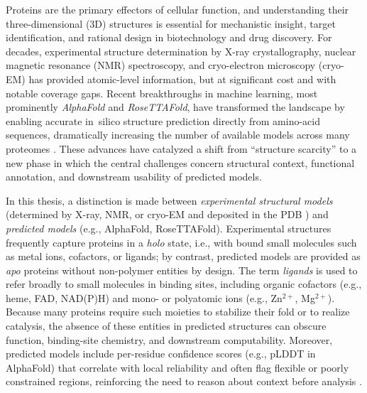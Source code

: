 \label{chap:introduction}

Proteins are the primary effectors of cellular function, and understanding their three-dimensional (3D) structures is essential for mechanistic insight, target identification, and rational design in biotechnology and drug discovery. For decades, experimental structure determination by X-ray crystallography, nuclear magnetic resonance (NMR) spectroscopy, and cryo-electron microscopy (cryo-EM) has provided atomic-level information, but at significant cost and with notable coverage gaps. Recent breakthroughs in machine learning, most prominently \textit{AlphaFold} and \textit{RoseTTAFold}, have transformed the landscape by enabling accurate in~silico structure prediction directly from amino-acid sequences, dramatically increasing the number of available models across many proteomes \cite{jumperHighlyAccurateProtein2021, baekAccuratePredictionProtein2021,tunyasuvunakoolHighlyAccurateProtein2021}. These advances have catalyzed a shift from ``structure scarcity'' to a new phase in which the central challenges concern structural context, functional annotation, and downstream usability of predicted models.

In this thesis, a distinction is made between \emph{experimental structural models} (determined by X-ray, NMR, or cryo-EM and deposited in the PDB \cite{burleyRCSBProteinData2019}) and \emph{predicted models} (e.g., AlphaFold, RoseTTAFold). Experimental structures frequently capture proteins in a \emph{holo} state, i.e., with bound small molecules such as metal ions, cofactors, or ligands; by contrast, predicted models are provided as \emph{apo} proteins without non-polymer entities by design. The term \emph{ligands} is used to refer broadly to small molecules in binding sites, including organic cofactors (e.g., heme, FAD, NAD(P)H) and mono- or polyatomic ions (e.g., Zn$^{2+}$, Mg$^{2+}$). Because many proteins require such moieties to stabilize their fold or to realize catalysis, the absence of these entities in predicted structures can obscure function, binding-site chemistry, and downstream computability. Moreover, predicted models include per-residue confidence scores (e.g., pLDDT in AlphaFold) that correlate with local reliability and often flag flexible or poorly constrained regions, reinforcing the need to reason about context before analysis \cite{jumperHighlyAccurateProtein2021, burleyRCSBProteinData2019, hekkelmanAlphaFillEnrichingAlphaFold2023}.

